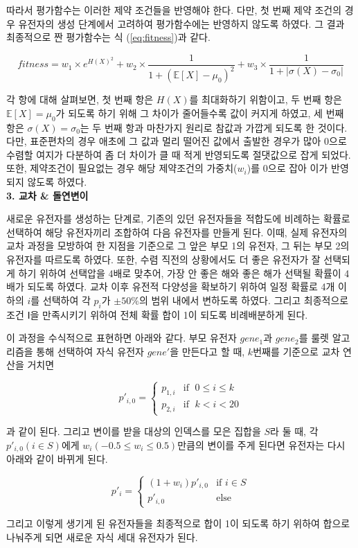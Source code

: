 따라서 평가함수는 이러한 제약 조건들을 반영해야 한다. 다만, 첫 번째 제약 조건의 경우 유전자의 생성 단계에서 고려하여 평가함수에는 반영하지 않도록 하였다. 그 결과 최종적으로 짠 평가함수는 식 (\ref{eq:fitness})과 같다.

\begin{equation}
    \label{eq:fitness}
    fitness = w_1 \times e^{H(X)^2} + w_2 \times \frac{1}{1+(\mathbb{E}[X]-\mu_0)^2} + w_3 \times \frac{1}{1+|\sigma(X)-\sigma_0|}
\end{equation}

각 항에 대해 살펴보면, 첫 번째 항은 $H(X)$를 최대화하기 위함이고, 두 번째 항은 $\mathbb{E}[X]=\mu_0$가 되도록 하기 위해 그 차이가 줄어들수록 값이 커지게 하였고, 세 번째 항은 $\sigma(X)=\sigma_0$는 두 번째 항과 마찬가지 원리로 참값과 가깝게 되도록 한 것이다. 다만, 표준편차의 경우 애초에 그 값과 멀리 떨어진 값에서 출발한 경우가 많아 0으로 수렴할 여지가 다분하여 좀 더 차이가 클 때 적게 반영되도록 절댓값으로 잡게 되었다. 또한, 제약조건이 필요없는 경우 해당 제약조건의 가중치($w_i$)를 0으로 잡아 이가 반영되지 않도록 하였다.\\

\textbf{3. 교차 \& 돌연변이}

새로운 유전자를 생성하는 단계로, 기존의 있던 유전자들을 적합도에 비례하는 확률로 선택하여 해당 유전자끼리 조합하여 다음 유전자를 만들게 된다. 이때, 실제 유전자의 교차 과정을 모방하여 한 지점을 기준으로 그 앞은 부모 1의 유전자, 그 뒤는 부모 2의 유전자를 따르도록 하였다. 또한, 수렴 직전의 상황에서도 더 좋은 유전자가 잘 선택되게 하기 위하여 선택압을 4배로 맞추어, 가장 안 좋은 해와 좋은 해가 선택될 확률이 4배가 되도록 하였다.
교차 이후 유전적 다양성을 확보하기 위하여 일정 확률로 4개 이하의 $i$를 선택하여 각 $p_i$가 $\pm 50\%$의 범위 내에서 변하도록 하였다. 그리고 최종적으로 조건 Ⅰ을 만족시키기 위하여 전체 확률 합이 1이 되도록 비례배분하게 된다.

이 과정을 수식적으로 표현하면 아래와 같다. 부모 유전자 $gene_1$과 $gene_2$를 룰렛 알고리즘을 통해 선택하여 자식 유전자 $gene'$을 만든다고 할 때, $k$번째를 기준으로 교차 연산을 거치면 

\begin{equation*}
    p'_{i, 0} = \begin{cases}
        p_{1, i} & \text{if $\; 0 \leq i \leq k$}\\
        p_{2, i} & \text{if $\; k < i < 20$}
    \end{cases}
\end{equation*}

과 같이 된다. 그리고 변이를 받을 대상의 인덱스를 모은 집합을 $S$라 둘 때, 각 $p'_{i, 0} (i \in S)$에게 $w_i (-0.5 \leq w_i \leq 0.5)$만큼의 변이를 주게 된다면 유전자는 다시 아래와 같이 바뀌게 된다.

\begin{equation*}
    p'_i = \begin{cases}
        (1+w_i) p'_{i, 0} & \text{if $i \in S$}\\
        p'_{i, 0} & \text{else}
    \end{cases}
\end{equation*}

그리고 이렇게 생기게 된 유전자들을 최종적으로 합이 1이 되도록 하기 위하여 합으로 나눠주게 되면 새로운 자식 세대 유전자가 된다.